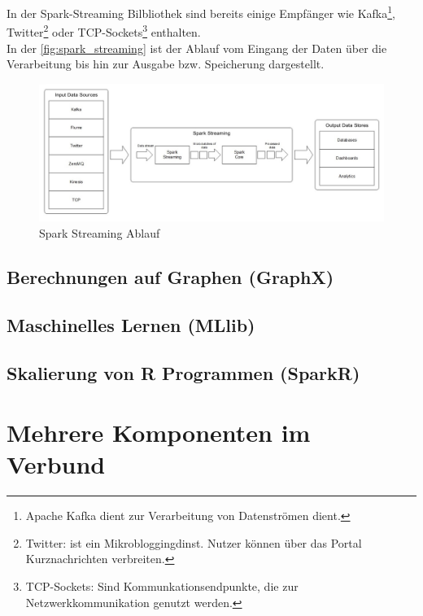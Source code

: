 \noindent
In der Spark-Streaming Bilbliothek sind bereits einige Empfänger wie Kafka\footnote{Apache Kafka dient zur Verarbeitung von Datenströmen dient.}, Twitter\footnote{Twitter: ist ein Mikrobloggingdinst. Nutzer können über das Portal Kurznachrichten verbreiten. } oder TCP-Sockets\footnote{TCP-Sockets: Sind Kommunkationsendpunkte, die zur Netzwerkkommunikation genutzt werden. } enthalten. \\
In der \autoref{fig:spark_streaming} ist der Ablauf vom Eingang der Daten über die Verarbeitung bis hin zur Ausgabe bzw. Speicherung dargestellt.

\begin{figure}[h]
  \centering
  \includegraphics[width=\textwidth]{./bilder/spark_streaming.jpg}
  \caption{Spark Streaming Ablauf \cite{INFOQ_STREAMING}}\label{fig:spark_streaming}
\end{figure}





\newpage
\subsection{Berechnungen auf Graphen (GraphX)}

\newpage
\subsection{Maschinelles Lernen (MLlib)}\label{sec_sparkmlib}

\newpage
\subsection{Skalierung von R Programmen (SparkR)}\label{sec_sparkr}

\newpage
\section{Mehrere Komponenten im Verbund}


